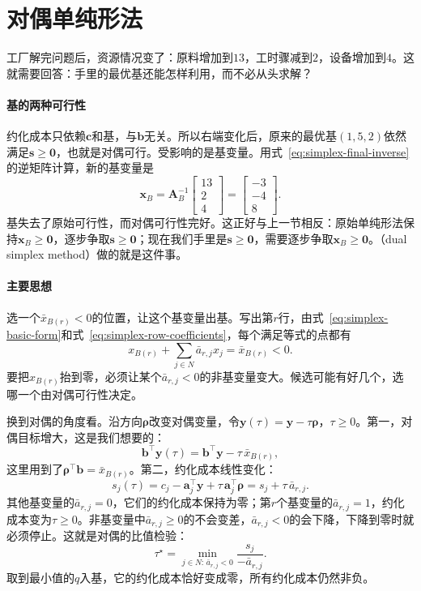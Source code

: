 \section{对偶单纯形法}
\label{sec:simplex-dual}

工厂解完问题后，资源情况变了：原料增加到$13$，工时骤减到$2$，设备增加到$4$。这就需要回答：手里的最优基还能怎样利用，而不必从头求解？

\paragraph{基的两种可行性}
约化成本只依赖$\bm{c}$和基，与$\bm{b}$无关。所以右端变化后，原来的最优基$(1,5,2)$依然满足$\bm{s}\geq\bm{0}$，也就是对偶可行。受影响的是基变量。用式~\eqref{eq:simplex-final-inverse}的逆矩阵计算，新的基变量是
\[
 \bm{x}_B=\bm{A}_B^{-1}\begin{bmatrix}13\\2\\4\end{bmatrix}=\begin{bmatrix}-3\\-4\\8\end{bmatrix}.
\]
基失去了原始可行性，而对偶可行性完好。这正好与上一节相反：原始单纯形法保持$\bm{x}_B\geq\bm{0}$，逐步争取$\bm{s}\geq\bm{0}$；现在我们手里是$\bm{s}\geq\bm{0}$，需要逐步争取$\bm{x}_B\geq\bm{0}$。（dual simplex method）做的就是这件事。

\paragraph{主要思想}
选一个$\bar{x}_{B(r)}<0$的位置，让这个基变量出基。写出第$r$行，由式~\eqref{eq:simplex-basic-form}和式~\eqref{eq:simplex-row-coefficients}，每个满足等式的点都有
\begin{equation}
 x_{B(r)}+\sum_{j\in N}\bar{a}_{r,j}x_j=\bar{x}_{B(r)}<0.
 \label{eq:simplex-dual-row}
\end{equation}
要把$x_{B(r)}$抬到零，必须让某个$\bar{a}_{r,j}<0$的非基变量变大。候选可能有好几个，选哪一个由对偶可行性决定。

换到对偶的角度看。沿方向$\bm{\rho}$改变对偶变量，令$\bm{y}(\tau)=\bm{y}-\tau\bm{\rho}$，$\tau\geq0$。第一，对偶目标增大，这是我们想要的：
\[
 \bm{b}^\top\bm{y}(\tau)=\bm{b}^\top\bm{y}-\tau\,\bar{x}_{B(r)},
\]
这里用到了$\bm{\rho}^\top\bm{b}=\bar{x}_{B(r)}$。第二，约化成本线性变化：
\begin{equation}
 s_j(\tau)=c_j-\bm{a}_j^\top\bm{y}+\tau\,\bm{a}_j^\top\bm{\rho}=s_j+\tau\,\bar{a}_{r,j}.
 \label{eq:simplex-dual-reduced-cost}
\end{equation}
其他基变量的$\bar{a}_{r,j}=0$，它们的约化成本保持为零；第$r$个基变量的$\bar{a}_{r,j}=1$，约化成本变为$\tau\geq0$。非基变量中$\bar{a}_{r,j}\geq0$的不会变差，$\bar{a}_{r,j}<0$的会下降，下降到零时就必须停止。这就是对偶的比值检验：
\begin{equation}
 \tau^\star=\min_{j\in N:\,\bar{a}_{r,j}<0}\frac{s_j}{-\bar{a}_{r,j}}.
 \label{eq:simplex-dual-ratio}
\end{equation}
取到最小值的$q$入基，它的约化成本恰好变成零，所有约化成本仍然非负。


